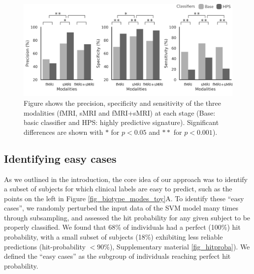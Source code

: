\documentclass[authoryear]{elsarticle}
\begin{document}
\begin{figure}[ht]
\centering
\includegraphics[width=\linewidth]{figures/hpc_cnad_multimodal.png}
\caption{Figure shows the precision, specificity and sensitivity of the three modalities (fMRI, sMRI and fMRI+sMRI) at each stage (Base: basic classifier and HPS: highly predictive signature). Significant differences are shown with $*$ for $p<0.05$ and $**$ for $p<0.001$).}
\label{fig_hpc_cnad}
\end{figure}

\subsection*{Identifying easy cases}
As we outlined in the introduction, the core idea of our approach was to identify a subset of subjects for which clinical labels are easy to predict, such as the points on the left in Figure \ref{fig_biotype_modes_toy}A. To identify these ``easy cases'', we randomly perturbed the input data of the SVM model many times through subsampling, and assessed the hit probability for any given subject to be properly classified. We found that 68\% of individuals had a perfect (100\%) hit probability, with a small subset of subjects (18\%) exhibiting less reliable predictions (hit-probability $<90\%$), Supplementary material \ref{fig_hitproba}). We defined the ``easy cases'' as the subgroup of individuals reaching perfect hit probability. 
\end{document}
